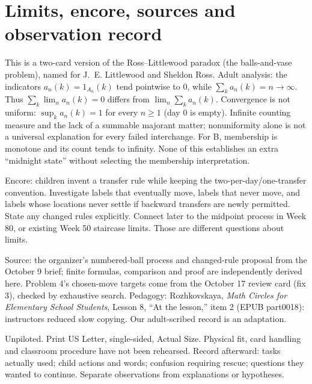 \documentclass[11pt,letterpaper]{article}
\begin{document}
\section*{Limits, encore, sources and observation record}
This is a two-card version of the Ross--Littlewood paradox (the balls-and-vase problem), named for J.~E. Littlewood and Sheldon Ross. Adult analysis: the indicators $a_n(k)=1_{A_n}(k)$ tend pointwise to 0, while $\sum_k a_n(k)=n\to\infty$. Thus $\sum_k\lim_n a_n(k)=0$ differs from $\lim_n\sum_k a_n(k)$. Convergence is not uniform: $\sup_k a_n(k)=1$ for every $n\ge1$ (day 0 is empty). Infinite counting measure and the lack of a summable majorant matter; nonuniformity alone is not a universal explanation for every failed interchange. For B, membership is monotone and its count tends to infinity. None of this establishes an extra ``midnight state'' without selecting the membership interpretation.

Encore: children invent a transfer rule while keeping the two-per-day/one-transfer convention. Investigate labels that eventually move, labels that never move, and labels whose locations never settle if backward transfers are newly permitted. State any changed rules explicitly. Connect later to the midpoint process in Week 80, or existing Week 50 staircase limits. Those are different questions about limits.

Source: the organizer's numbered-ball process and changed-rule proposal from the October 9 brief; finite formulas, comparison and proof are independently derived here. Problem 4's chosen-move targets come from the October 17 review card (fix 3), checked by exhaustive search. Pedagogy: Rozhkovskaya, \emph{Math Circles for Elementary School Students}, Lesson 8, ``At the lesson,'' item 2 (EPUB part0018): instructors reduced slow copying. Our adult-scribed record is an adaptation.

Unpiloted. Print US Letter, single-sided, Actual Size. Physical fit, card handling and classroom procedure have not been rehearsed. Record afterward: tasks actually used; child actions and words; confusion requiring rescue; questions they wanted to continue. Separate observations from explanations or hypotheses.
\end{document}
